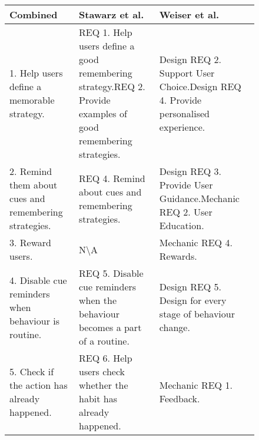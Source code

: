 \begin{figure}[ht] %

  \begin{tabular}{ |p{7cm}|p{7.5cm}|p{8cm}| }
    \hline
    \small{\textbf{Combined}} & \small{\textbf{Stawarz et al.~\cite{article_beyond_self_tracking_designing_apps}}} & \small{\textbf{Weiser et al.~\cite{article_taxonomy_motivational_affordances_meaningful}}} \\ \hline %
    \small{1. Help users define a memorable strategy.} & \small{REQ 1. Help users define a good remembering strategy.\newline REQ 2. Provide examples of good remembering strategies.} & \small{Design REQ 2. Support User Choice.\newline Design REQ 4. Provide personalised experience.} \\ \hline
    \small{2. Remind them about cues and remembering strategies.} & \small{REQ 4. Remind about cues and remembering strategies.} & \small{Design REQ 3. Provide User Guidance.\newline Mechanic REQ 2. User Education.} \\ \hline
    \small{3. Reward users.} & \small{N\textbackslash A} & \small{Mechanic REQ 4. Rewards.} \\ \hline
    \small{4. Disable cue reminders when behaviour is routine.} & \small{REQ 5. Disable cue reminders when the behaviour becomes a part of a routine.} & \small{Design REQ 5. Design for every stage of behaviour change.} \\ \hline
    \small{5. Check if the action has already happened.} & \small{REQ 6. Help users check whether the habit has already happened.} & \small{Mechanic REQ 1. Feedback.} \\ \hline
  \end{tabular}
\end{figure}
